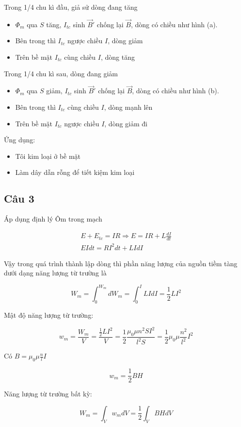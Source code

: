Trong 1/4 chu kì đầu, giả sử dòng đang tăng

\begin{itemize}
  \item $\Phi_m$ qua $S$ tăng, $I_{tc}$ sỉnh $\vec{B}'$ chống lại $\vec{B}$, dòng có chiều như hình (a).
  \item Bên trong thì $I_{tc}$ ngược chiều $I$, dòng giảm
  \item Trên bề mặt $I_{tc}$ cùng chiều $I$, dòng tăng 
\end{itemize}

Trong 1/4 chu kì sau, dòng đang giảm

\begin{itemize}
  \item $\Phi_m$ qua $S$ giảm, $I_{tc}$ sinh $\vec{B}'$ chống lại $\vec{B}$, dòng có chiều như hình (b).
  \item Bên trong thì $I_{tc}$ cùng chiều $I$, dòng mạnh lên
  \item Trên bề mặt $I_{tc}$ ngược chiều $I$, dòng giảm đi
\end{itemize}

Ứng dụng:

\begin{itemize}
  \item Tôi kim loại ở bề mặt
  \item Làm dây dẫn rỗng để tiết kiệm kim loại
\end{itemize}

\subsection{Câu 3}

Áp dụng định lý Ôm trong mạch 

\begin{gather*}
  E + E_{tc} = IR \Rightarrow E = IR + L\frac{dI}{dt} \\
  EIdt = RI^2dt + LIdI
\end{gather*}

Vậy trong quá trình thành lập dòng thì phần năng lượng của nguồn tiềm tàng dưới dạng năng lượng từ trường là

\begin{equation*}
  W_m = \int_{0}^{W_m} dW_m = \int_{0}^{I} LIdI = \frac{1}{2}LI^2
\end{equation*}

Mật độ năng lượng từ trường:

\begin{equation*}
  w_m = \frac{W_m}{V} = \frac{\frac{1}{2}LI^2}{V} = \frac{1}{2} \frac{\mu_0\mu n^2 SI^2}{l^2 S} = \frac{1}{2} \mu_0 \mu \frac{n^2}{l^2} I^2
\end{equation*}

Có $B = \mu_0\mu \frac{n}{l} I$

\begin{equation*}
  w_m = \frac{1}{2} BH
\end{equation*}

Năng lượng từ trường bất kỳ:

\begin{equation*}
  W_m = \int_V w_mdV = \frac{1}{2} \int_V BHdV
\end{equation*}
